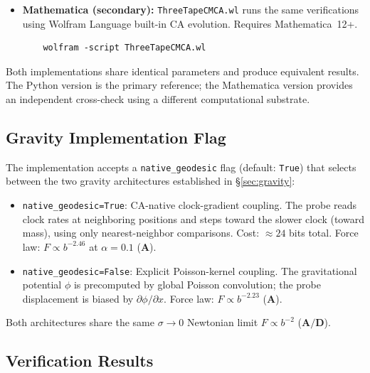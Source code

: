 \documentclass[11pt]{article}
\theoremstyle{remark}
\newcommand{\CatA}{\textbf{A}}
\newcommand{\CatAD}{\textbf{A/D}}
\begin{document}
\begin{appendices}
\begin{itemize}
    \begin{verbatim}
    cd papers/45_three_tape_cmca/scripts
    python3 run_all_verifications.py
    \end{verbatim}

  \item \textbf{Mathematica (secondary):} \texttt{ThreeTapeCMCA.wl} runs the same
    verifications using Wolfram Language built-in CA evolution. Requires
    Mathematica~12+.

    \begin{verbatim}
    wolfram -script ThreeTapeCMCA.wl
    \end{verbatim}
\end{itemize}

Both implementations share identical parameters and produce equivalent results. The
Python version is the primary reference; the Mathematica version provides an independent
cross-check using a different computational substrate.

\subsection{Gravity Implementation Flag}

The implementation accepts a \texttt{native\_geodesic} flag (default: \texttt{True})
that selects between the two gravity architectures established in \S\ref{sec:gravity}:

\begin{itemize}
  \item \texttt{native\_geodesic=True}: CA-native clock-gradient coupling. The probe
    reads clock rates at neighboring positions and steps toward the slower clock
    (toward mass), using only nearest-neighbor comparisons. Cost: $\approx 24$ bits
    total. Force law: $F\propto b^{-2.46}$ at $\alpha=0.1$ ($\CatA$).

  \item \texttt{native\_geodesic=False}: Explicit Poisson-kernel coupling. The gravitational
    potential $\phi$ is precomputed by global Poisson convolution; the probe displacement
    is biased by $\partial\phi/\partial x$. Force law: $F\propto b^{-2.23}$ ($\CatA$).
\end{itemize}

Both architectures share the same $\sigma\to0$ Newtonian limit $F\propto b^{-2}$ ($\CatAD$).

\subsection{Verification Results}


\end{appendices}
\end{document}
